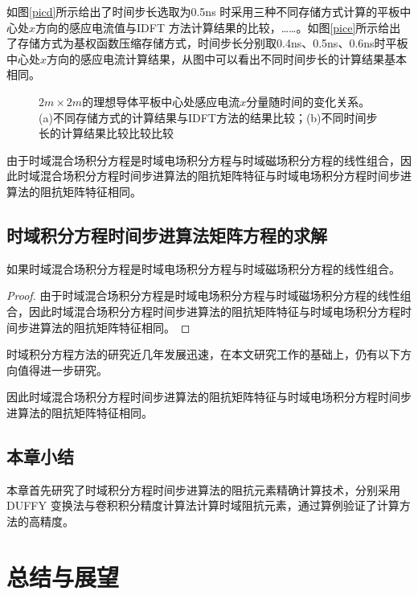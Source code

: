 \documentclass[promaster]{thesis-uestc}
\begin{document}
如图\ref{picd}所示给出了时间步长选取为0.5ns 时采用三种不同存储方式计算的平板中心处$x$方向的感应电流值与IDFT 方法计算结果的比较，……。如图\ref{pice}所示给出了存储方式为基权函数压缩存储方式，时间步长分别取0.4ns、0.5ns、0.6ns时平板中心处$x$方向的感应电流计算结果，从图中可以看出不同时间步长的计算结果基本相同。

\begin{figure}[h]
    \caption{$2m\times 2m$的理想导体平板中心处感应电流$x$分量随时间的变化关系。(a)不同存储方式的计算结果与IDFT方法的结果比较；(b)不同时间步长的计算结果比较比较比较}
    \label{fig2}
\end{figure}

由于时域混合场积分方程是时域电场积分方程与时域磁场积分方程的线性组合，因此时域混合场积分方程时间步进算法的阻抗矩阵特征与时域电场积分方程时间步进算法的阻抗矩阵特征相同。

\section{时域积分方程时间步进算法矩阵方程的求解}
\begin{theorem}
    如果时域混合场积分方程是时域电场积分方程与时域磁场积分方程的线性组合。
\end{theorem}
\begin{proof}
    由于时域混合场积分方程是时域电场积分方程与时域磁场积分方程的线性组合，因此时域混合场积分方程时间步进算法的阻抗矩阵特征与时域电场积分方程时间步进算法的阻抗矩阵特征相同。
\end{proof}
\begin{corollary}
    时域积分方程方法的研究近几年发展迅速，在本文研究工作的基础上，仍有以下方向值得进一步研究。
\end{corollary}
\begin{lemma}
    因此时域混合场积分方程时间步进算法的阻抗矩阵特征与时域电场积分方程时间步进算法的阻抗矩阵特征相同。
\end{lemma}

\section{本章小结}
本章首先研究了时域积分方程时间步进算法的阻抗元素精确计算技术，分别采用DUFFY 变换法与卷积积分精度计算法计算时域阻抗元素，通过算例验证了计算方法的高精度。

\chapter{总结与展望}
\end{document}
